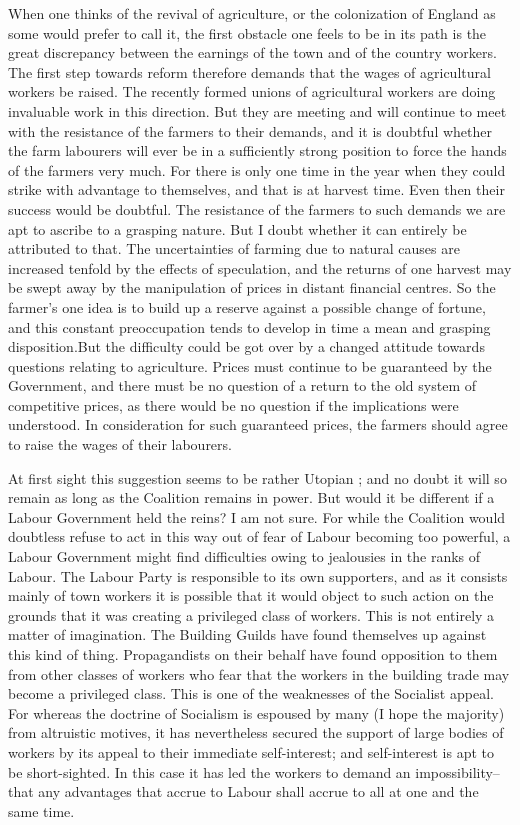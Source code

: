 \documentclass{book}
\begin{document}
When one thinks of the revival of agriculture, or the colonization of England as some would prefer to call it, the first obstacle one feels to be in its path is the great discrepancy between the earnings of the town and of the country workers. The first step towards reform therefore demands that the wages of agricultural workers be raised. The recently formed unions of agricultural workers are doing invaluable work in this direction. But they are meeting and will continue to meet with the resistance of the farmers to their demands, and it is doubtful whether the farm labourers will ever be in a sufficiently strong position to force the hands of the farmers very much. For there is only one time in the year when they could strike with advantage to themselves, and that is at harvest time. Even then their success would be doubtful. The resistance of the farmers to such demands we are apt to ascribe to a grasping nature. But I doubt whether it can entirely be attributed to that. The uncertainties of farming due to natural causes are increased tenfold by the effects of speculation, and the returns of one harvest may be swept away by the manipulation of prices in distant financial centres. So the farmer’s one idea is to build up a reserve against a possible change of fortune, and this constant preoccupation tends to develop in time a mean and grasping disposition.\footnotemark[1] But the difficulty could be got over by a changed attitude towards questions relating to agriculture. Prices must continue to be guaranteed by the Government, and there must be no question of a return to the old system of competitive prices, as there would be no question if the implications were understood. In consideration for such guaranteed prices, the farmers should agree to raise the wages of their labourers.

At first sight this suggestion seems to be rather Utopian ; and no doubt it will so remain as long as the Coalition remains in power. But would it be different if a Labour Government held the reins? I am not sure. For while the Coalition would doubtless refuse to act in this way out of fear of Labour becoming too powerful, a Labour Government might find difficulties owing to jealousies in the ranks of Labour. The Labour Party is responsible to its own supporters, and as it consists mainly of town workers it is possible that it would object to such action on the grounds that it was creating a privileged class of workers. This is not entirely a matter of imagination. The Building Guilds have found themselves up against this kind of thing. Propagandists on their behalf have found opposition to them from other classes of workers who fear that the workers in the building trade may become a privileged class. This is one of the weaknesses of the Socialist appeal. For whereas the doctrine of Socialism is espoused by many (I hope the majority) from altruistic motives, it has nevertheless secured the support of large bodies of workers by its appeal to their immediate self-interest; and self-interest is apt to be short-sighted. In this case it has led the workers to demand an impossibility–that any advantages that accrue to Labour shall accrue to all at one and the same time.
\end{document}
